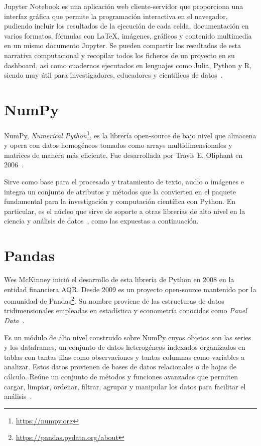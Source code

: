 \documentclass[a4paper, 12pt]{book}
\begin{document}
Jupyter Notebook es una aplicación web cliente-servidor que proporciona una interfaz gráfica que permite la programación interactiva en el navegador, pudiendo incluir los resultados de la ejecución de cada celda, documentación en varios formatos, fórmulas con LaTeX, imágenes, gráficos y contenido multimedia en un mismo documento Jupyter. Se pueden compartir los resultados de esta narrativa computacional y recopilar todos los ficheros de un proyecto en su dashboard, así como cuadernos ejecutados en lenguajes como Julia, Python y R, siendo muy útil para investigadores, educadores y científicos de datos~\cite{perez2015project}.

\section{NumPy} 
\label{sec:numpy}

NumPy, \emph{Numerical Python}\footnote{\url{https://numpy.org}}, es la librería open-source de bajo nivel que almacena y opera con datos homogéneos tomados como arrays multidimensionales y matrices de manera más eficiente. Fue desarrollada por Travis E. Oliphant en 2006~\cite{oliphant2006guide}.

Sirve como base para el procesado y tratamiento de texto, audio o imágenes e integra un conjunto de atributos y métodos que la convierten en el paquete fundamental para la investigación y computación científica con Python. En particular, es el núcleo que sirve de soporte a otras librerías de alto nivel en la ciencia y análisis de datos~\cite{harris2020array}, como las expuestas a continuación.

\section{Pandas} 
\label{sec:pandas}

Wes McKinney inició el desarrollo de esta librería de Python en 2008 en la entidad financiera AQR. Desde 2009 es un proyecto open-source mantenido por la comunidad de Pandas\footnote{\url{https://pandas.pydata.org/about}}. Su nombre proviene de las estructuras de datos tridimensionales empleadas en estadística y econometría conocidas como \emph{Panel Data}~\cite{mckinney2011pandas}.

Es un módulo de alto nivel construido sobre NumPy cuyos objetos son las series y los dataframes, un conjunto de datos heterogéneos indexados organizados en tablas con tantas filas como observaciones y tantas columnas como variables a analizar. Estos datos provienen de bases de datos relacionales o de hojas de cálculo. Reúne un conjunto de métodos y funciones avanzadas que permiten cargar, limpiar, ordenar, filtrar, agrupar y manipular los datos para facilitar el análisis~\cite{McKinneyWes2018Pfda, VanderplasJake2017Pdsh}. %
\end{document}
